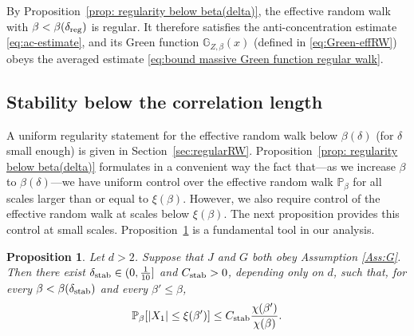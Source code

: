 \documentclass[11pt,a4paper]{article}
\numberwithin{equation}{section}
\theoremstyle{plain}
\newtheorem{Prop}[Thm]{Proposition}
\theoremstyle{definition}
\newcommand\1{\mathds{1}}
\newcommand{\Cstab}{C_{\textup{stab}}}
\newcommand{\deltastab}{\delta_{\textup{stab}}}
\newcommand{\deltareg}{\delta_{\textup{reg}}}
\begin{document}
By Proposition~\ref{prop: regularity below beta(delta)},
the effective random walk with $\beta<\beta(\deltareg)$ is regular.
It therefore satisfies the anti-concentration estimate \eqref{eq:ac-estimate}, and its Green function
$\mathbb G_{Z,\beta}(x)$ (defined in \eqref{eq:Green-effRW}) obeys
the averaged estimate \eqref{eq:bound massive Green function regular walk}.

\subsection{Stability below the correlation length}
\label{sec:stabilityintro}


A uniform regularity statement for the effective random walk below $\beta(\delta)$ (for $\delta$ small enough) is given in
Section~\ref{sec:regularRW}.
Proposition~\ref{prop: regularity below beta(delta)} formulates in a convenient way the fact that---as we increase $\beta$ to $\beta(\delta)$---we have uniform control over the effective random walk $\mathbb P_\beta$ for all scales larger than or equal to $\xi(\beta)$. However, we also require control of the effective random walk at
scales  below $\xi(\beta)$.
The next proposition provides this control at small scales.
Proposition~\ref{Prop:Stability section 2} is a fundamental tool in our analysis.

\begin{Prop}\label{Prop:Stability section 2} Let $d>2$. Suppose that $J$ and $G$ both obey Assumption \textup{\ref{Ass:G}}. Then there exist $\deltastab\in (0,\tfrac{1}{10}]$ and $\Cstab>0$, depending only on $d$, such that, for every $\beta<\beta(\deltastab)$ and every $\beta'\leq \beta$,
\begin{equation}\label{eq:Stability Section 2}
	\mathbb P_\beta[|X_1|\leq \xi(\beta')]\leq \Cstab \frac{\chi(\beta')}{\chi(\beta)}.
\end{equation}
\end{Prop}
\end{document}
